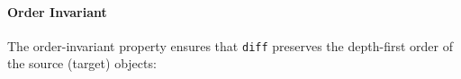 \documentclass{sigplanconf}
\theoremstyle{plain}
\newtheorem{prop}{Proposition}
\begin{document}

\paragraph{Order Invariant}
The order-invariant property ensures that \texttt{diff} preserves the
depth-first order of the source (target) objects:


\end{document}
